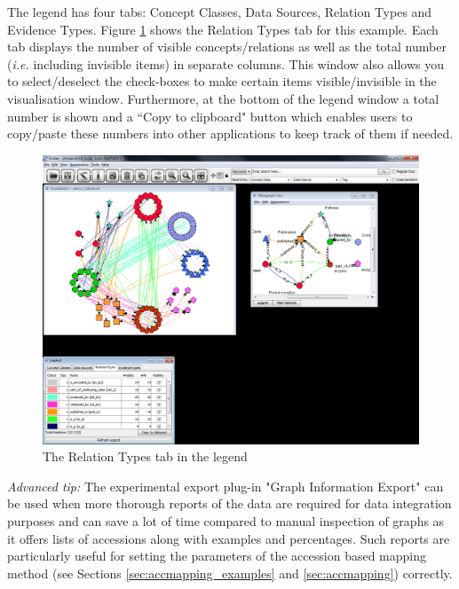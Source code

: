 \exerciserule

The legend has four tabs: Concept Classes, Data Sources, Relation Types and Evidence Types. 
Figure \ref{fig:aracyc_legend_other_tabs} shows the Relation Types tab for this example.
Each tab displays the number of visible concepts/relations as well as the total number ({\it{i.e.}} including invisible items) in separate columns.
This window also allows you to select/deselect the check-boxes to make certain items visible/invisible in the visualisation window.
Furthermore, at the bottom of the legend window a total number is shown and a ``Copy to clipboard" button which enables users to copy/paste these numbers into other applications to keep track of them if needed.
\begin{figure}[H]
\centering
\includegraphics[scale=0.3]{images/Jun12/aracyc_legend_other_tabs.png} 
\caption{The Relation Types tab in the legend}
\label{fig:aracyc_legend_other_tabs}
\end{figure}

\emph{Advanced tip:} The experimental export plug-in "Graph Information Export" can be used when more thorough reports of the data are required for data integration purposes and can save a lot of time compared to manual inspection of graphs as it offers lists of accessions along with examples and percentages.
Such reports are particularly useful for setting the parameters of the accession based mapping method 
(see Sections \ref{sec:accmapping_examples} and \ref{sec:accmapping}) correctly.


